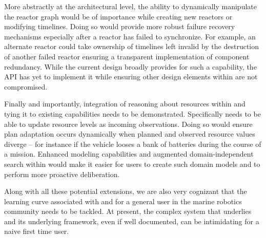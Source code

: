 More abstractly at the architectural level, the ability to dynamically
manipulate the reactor graph would be of importance while creating new
reactors or modifying timelines. Doing so would provide more robust
failure recovery mechanisms especially after a reactor has failed to
synchronize. For example, an alternate reactor could take ownership of
timelines left invalid by the destruction of another failed reactor
ensuring a transparent implementation of component redundancy. While
the current design broadly provides for such a capability, the \rx API
has yet to implement it while ensuring other design elements within
are not compromised.

Finally and importantly, integration of reasoning about resources
within \rx and tying it to existing \eu capabilities needs to be
demonstrated. Specifically \rx needs to be able to update resource
levels as incoming observations.  Doing so would ensure plan
adaptation occurs dynamically when planned and observed resource
values diverge -- for instance if the vehicle looses a bank of
batteries during the course of a mission.  Enhanced modeling
capabilities and augmented domain-independent search within \eu would
make it easier for \rx users to create such domain models and to
perform more proactive deliberation.

Along with all these potential extensions, we are also very cognizant
that the learning curve associated with \rx and \eu for a general user
in the marine robotics community needs to be tackled. At present, the
complex system that underlies \rx and its underlying framework, even
if well documented, can be intimidating for a naive first time user.






